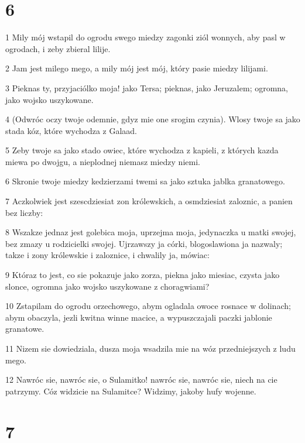 \chapter{6}

\par 1 Mily mój wstapil do ogrodu swego miedzy zagonki ziól wonnych, aby pasl w ogrodach, i zeby zbieral lilije.
\par 2 Jam jest milego mego, a mily mój jest mój, który pasie miedzy lilijami.
\par 3 Pieknas ty, przyjaciólko moja! jako Tersa; pieknas, jako Jeruzalem; ogromna, jako wojsko uszykowane.
\par 4 (Odwróc oczy twoje odemnie, gdyz mie one srogim czynia). Wlosy twoje sa jako stada kóz, które wychodza z Galaad.
\par 5 Zeby twoje sa jako stado owiec, które wychodza z kapieli, z których kazda miewa po dwojgu, a nieplodnej niemasz miedzy niemi.
\par 6 Skronie twoje miedzy kedzierzami twemi sa jako sztuka jablka granatowego.
\par 7 Aczkolwiek jest szescdziesiat zon królewskich, a osmdziesiat zaloznic, a panien bez liczby:
\par 8 Wszakze jednaz jest golebica moja, uprzejma moja, jedynaczka u matki swojej, bez zmazy u rodzicielki swojej. Ujrzawszy ja córki, blogoslawiona ja nazwaly; takze i zony królewskie i zaloznice, i chwalily ja, mówiac:
\par 9 Któraz to jest, co sie pokazuje jako zorza, piekna jako miesiac, czysta jako slonce, ogromna jako wojsko uszykowane z choragwiami?
\par 10 Zstapilam do ogrodu orzechowego, abym ogladala owoce rosnace w dolinach; abym obaczyla, jezli kwitna winne macice, a wypuszczajali paczki jablonie granatowe.
\par 11 Nizem sie dowiedziala, dusza moja wsadzila mie na wóz przedniejszych z ludu mego.
\par 12 Nawróc sie, nawróc sie, o Sulamitko! nawróc sie, nawróc sie, niech na cie patrzymy. Cóz widzicie na Sulamitce? Widzimy, jakoby hufy wojenne.

\chapter{7}

